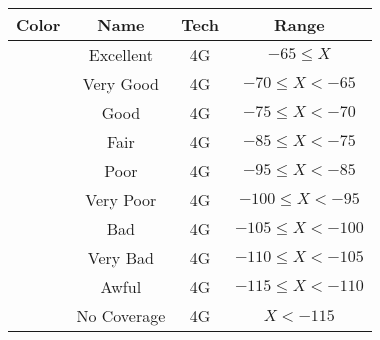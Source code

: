 \begin{tabular}{|c|c|c|c|}\hline
\rowcolor{Plum!20}
Color&Name&Tech&Range\\\hline\hline
\cellcolor[HTML]{00703c} &Excellent&4G&$-65\leq X$\\\hline
\cellcolor[HTML]{00a032} &Very Good&4G&$-70\leq X<-65$\\\hline
\cellcolor[HTML]{00d228} &Good&4G&$-75\leq X<-70$\\\hline
\cellcolor[HTML]{ffff00} &Fair&4G&$-85\leq X<-75$\\\hline
\cellcolor[HTML]{ffaa00} &Poor&4G&$-95\leq X<-85$\\\hline
\cellcolor[HTML]{fa6400} &Very Poor&4G&$-100\leq X<-95$\\\hline
\cellcolor[HTML]{ff0000} &Bad&4G&$-105\leq X<-100$\\\hline
\cellcolor[HTML]{dc143c} &Very Bad&4G&$-110\leq X<-105$\\\hline
\cellcolor[HTML]{820000} &Awful&4G&$-115\leq X<-110$\\\hline
\cellcolor[HTML]{aaaaaa} &No Coverage&4G&$X<-115$\\\hline
\end{tabular}
